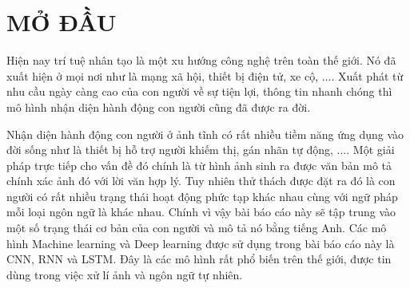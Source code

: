 \chapter{MỞ ĐẦU} %

\label{Chapter1} %


\newcommand{\keyword}[1]{\textbf{#1}}
\newcommand{\tabhead}[1]{\textbf{#1}}
\newcommand{\code}[1]{\texttt{#1}}
\newcommand{\file}[1]{\texttt{\bfseries#1}}
\newcommand{\option}[1]{\texttt{\itshape#1}}

Hiện nay trí tuệ nhân tạo là một xu hướng công nghệ trên toàn thế giới. Nó đã xuất hiện ở mọi nơi như là mạng xã hội, thiết bị điện tử, xe cộ, .... Xuất phát từ nhu cầu ngày càng cao của con người về sự tiện lợi, thông tin nhanh chóng thì mô hình nhận diện hành động con người cũng đã được ra đời.

Nhận diện hành động con người ở ảnh tĩnh có rất nhiều tiềm năng ứng dụng vào đời sống như là thiết bị hỗ trợ người khiếm thị, gán nhãn tự động, .... Một giải pháp trực tiếp cho vấn đề đó chính là từ hình ảnh sinh ra được văn bản mô tả chính xác ảnh đó với lời văn hợp lý. Tuy nhiên thử thách được đặt ra đó là con người có rất nhiều trạng thái hoạt động phức tạp khác nhau cùng với ngữ pháp mỗi loại ngôn ngữ là khác nhau. Chính vì vậy bài báo cáo này sẽ tập trung vào một số trạng thái cơ bản của con người và mô tả nó bằng tiếng Anh. Các mô hình Machine learning và Deep learning được sử dụng trong bài báo cáo này là CNN, RNN và LSTM. Đây là các mô hình rất phổ biến trên thế giới, được tin dùng trong việc xử lí ảnh và ngôn ngữ tự nhiên.